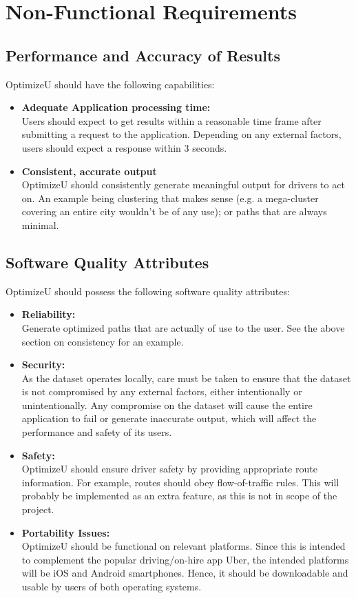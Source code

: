 \documentclass[12pt]{article}
\begin{document}
\section{Non-Functional Requirements}
\subsection{Performance and Accuracy of Results}
OptimizeU should have the following capabilities:
\begin{itemize}
	\item \textbf{Adequate Application processing time:}\\
		Users should expect to get results within a reasonable time frame after submitting
		a request to the application. Depending on any external factors,
		users should expect a response within 3 seconds.
	\item \textbf{Consistent, accurate output}\\
		OptimizeU should consistently generate meaningful output for drivers to act on.
		An example being clustering that makes sense (e.g. a mega-cluster covering an 
		entire city wouldn't be of any use); or paths that are always minimal.
\end{itemize}
\subsection{Software Quality Attributes}
OptimizeU should possess the following software quality attributes:
\begin{itemize}
	\item \textbf{Reliability:}\\
		Generate optimized paths that are actually of use to the user. See the above
		section on consistency for an example.
	\item \textbf{Security:}\\
		As the dataset operates locally, care must be taken to ensure that the dataset
		is not compromised by any external factors, either intentionally or 
		unintentionally. Any compromise on the dataset will cause the entire application
		to fail or generate inaccurate output, which will affect the performance and 
		safety of its users.
	\item \textbf{Safety:}\\
		OptimizeU should ensure driver safety by providing appropriate route information.
		For example, routes should obey flow-of-traffic rules. This will probably
		be implemented as an extra feature, as this is not in scope of the project.
	\item \textbf{Portability Issues:}\\
		OptimizeU should be functional on relevant platforms. Since this is intended
		to complement the popular driving/on-hire app Uber, the intended platforms will
		be iOS and Android smartphones. Hence, it should be downloadable and usable 
		by users of both operating systems.
\end{itemize}
\end{document}
